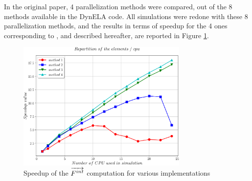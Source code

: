 In the original paper, 4 parallelization methods were compared, out of the 8 methods available in the DynELA code. All simulations were redone with these 8 parallelization methods, and the results in terms of speedup for the 4 ones corresponding to \cite{Pantale:2005}, and described hereafter, are reported in Figure \ref{speedup}.
\begin{figure}[h!] 
  \centering
  \includegraphics[width=0.75\textwidth]{./speedup.pdf}
  \caption{Speedup of the $\protect\overrightarrow{F^{int}}$ computation for various implementations}
  \label{speedup}
\end{figure}

